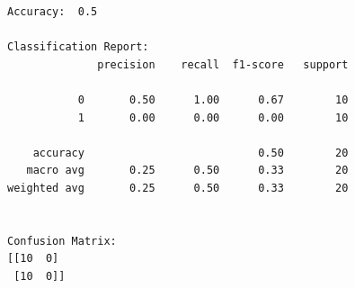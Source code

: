 \documentclass[11pt]{article}
\begin{document}
    \begin{Verbatim}[commandchars=\\\{\}]
Accuracy:  0.5

Classification Report:
              precision    recall  f1-score   support

           0       0.50      1.00      0.67        10
           1       0.00      0.00      0.00        10

    accuracy                           0.50        20
   macro avg       0.25      0.50      0.33        20
weighted avg       0.25      0.50      0.33        20


Confusion Matrix:
[[10  0]
 [10  0]]
    \end{Verbatim}


    
    
    
\end{document}
